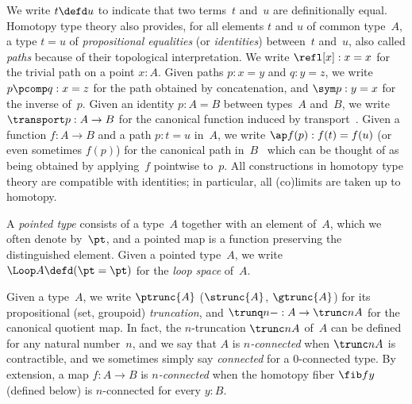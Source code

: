 \documentclass[a4paper]{article}
\begin{document}
We write $t\defd u$ to indicate that two terms~$t$ and~$u$ are definitionally equal. Homotopy type theory also provides, for all elements $t$ and $u$ of common type~$A$, a type $t=u$ of \emph{propositional equalities} (or \emph{identities}) between~$t$ and~$u$, also called \emph{paths} because of their topological interpretation. We write $\refl[x]:x=x$ for the trivial path on a point $x:A$. Given paths $p:x=y$ and $q:y=z$, we write $p\pcomp q:x=z$ for the path obtained by concatenation, and $\sym p:y=x$ for the inverse of~$p$.
%
Given an identity $p:A=B$ between types~$A$ and~$B$, we write $\transport p:A\to B$ for the canonical function induced by transport~\cite[Lemma 2.3.1]{hottbook}.
Given a function $f:A\to B$ and a path $p:t=u$ in~$A$, we write $\ap f(p):f(t)=f(u)$ (or even sometimes $f(p)$) for the canonical path in~$B$~\cite[Lemma 2.2.1]{hottbook} which can be thought of as being obtained by applying~$f$ pointwise to~$p$.
%
All constructions in homotopy type theory are compatible with identities; in particular, all (co)limits are taken up to homotopy.

A \emph{pointed type} consists of a type~$A$ together with an element of~$A$, which we often denote by~$\pt$, and a pointed map is a function preserving the distinguished element. Given a pointed type~$A$, we write $\Loop A\defd(\pt=\pt)$ for the \emph{loop space} of~$A$.

Given a type~$A$, we write $\ptrunc{A}$ (\resp $\strunc{A}$, \resp $\gtrunc{A}$) for its propositional (\resp set, \resp groupoid) \emph{truncation}, and $\trunq n-:A\to\trunc nA$ for the canonical quotient map. In fact, the $n$-truncation $\trunc nA$ of~$A$ can be defined for any natural number~$n$, and we say that $A$ is \emph{$n$-connected} when $\trunc nA$ is contractible, and we sometimes simply say \emph{connected} for a $0$-connected type.
By extension, a map $f:A\to B$ is \emph{$n$-connected} when the homotopy fiber $\fib fy$ (defined below) is $n$-connected for every $y:B$.
\end{document}
